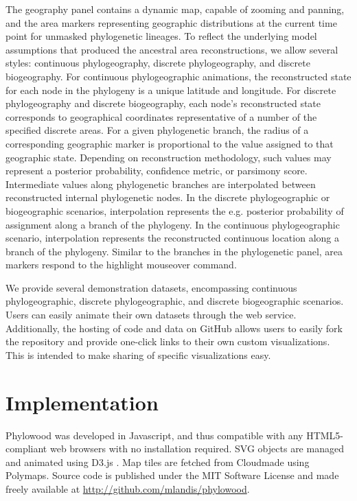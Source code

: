 \documentclass{bioinfo}
\begin{document}
The geography panel contains a dynamic map, capable of zooming and panning, and the area markers representing geographic distributions at the current time point for unmasked phylogenetic lineages. To reflect the underlying model assumptions that produced the ancestral area reconstructions, we allow several styles: continuous phylogeography, discrete phylogeography, and discrete biogeography. For continuous phylogeographic animations, the reconstructed state for each node in the phylogeny is a unique latitude and longitude. For discrete phylogeography and discrete biogeography, each node's reconstructed state corresponds to geographical coordinates representative of a number of the specified discrete areas. For a given phylogenetic branch, the radius of a corresponding geographic marker is proportional to the value assigned to that geographic state. Depending on reconstruction methodology, such values may represent a posterior probability, confidence metric, or parsimony score. Intermediate values along phylogenetic branches are interpolated between reconstructed internal phylogenetic nodes. In the discrete phylogeographic or biogeographic scenarios, interpolation represents the e.g. posterior probability of assignment along a branch of the phylogeny. In the continuous phylogeographic scenario, interpolation represents the reconstructed continuous location along a branch of the phylogeny. Similar to the branches in the phylogenetic panel, area markers respond to the highlight mouseover command.

We provide several demonstration datasets, encompassing continuous phylogeographic, discrete phylogeographic, and discrete biogeographic scenarios. Users can easily animate their own datasets through the web service. Additionally, the hosting of code and data on GitHub allows users to easily fork the repository and provide one-click links to their own custom visualizations. This is intended to make sharing of specific visualizations easy.

\section{Implementation}

Phylowood was developed in Javascript, and thus compatible with any HTML5-compliant web browsers with no installation required. SVG objects are managed and animated using D3.js \citep{bostock11}. Map tiles are fetched from Cloudmade using Polymaps. Source code is published under the MIT Software License and made freely available at \href{http://github.com/mlandis/phylowood}{http://github.com/mlandis/phylowood}.
\end{document}
